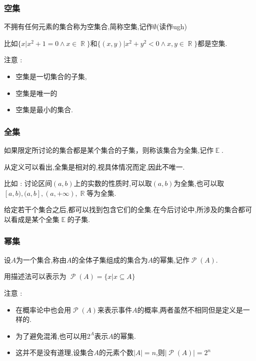 \documentclass[UTF8,12pt]{ctexbook}
\newcommand{\absoluteValue}[1]{\left\lvert #1 \right\vert}
\newcommand{\powerSetOf}[1]{\powerSet (#1)}
\DeclareMathOperator{\mathRealNumberCollection}{\mathbb{R}}
\DeclareMathOperator{\mathEverythingCollection}{\mathbb{E}}
\DeclareMathOperator{\powerSet}{\mathcal{P}}
\begin{document}
{{{{\subsubsection{空集}{
  不拥有任何元素的集合称为空集合,简称空集,记作$\emptyset$(读作ugh)

  比如$\{x | x^2 + 1 = 0 \land x \in \mathRealNumberCollection\}$和$\{(x,y) | x^2+y^2 < 0 \land x,y \in \mathRealNumberCollection\}$都是空集.

  注意 :

  \begin{itemize}
    \item 空集是一切集合的子集,
    \item 空集是唯一的
    \item 空集是最小的集合.
  \end{itemize}
}%

\subsubsection{全集}{
  如果限定所讨论的集合都是某个集合的子集，则称该集合为全集,记作$\mathEverythingCollection$.

  从定义可以看出,全集是相对的,视具体情况而定,因此不唯一.

  比如 : 讨论区间$(a,b)$上的实数的性质时,可以取$(a,b)$为全集,也可以取$[a,b),(a,b],(a , +\infty),\mathRealNumberCollection$等为全集.

  给定若干个集合之后,都可以找到包含它们的全集.在今后讨论中,所涉及的集合都可以看成是某个全集$\mathEverythingCollection$的子集.
}%

\subsubsection{幂集}{
  设$A$为一个集合,称由$A$的全体子集组成的集合为$A$的幂集,记作$\powerSetOf{A}$.

  用描述法可以表示为 $\powerSetOf{A} = \{x | x \subseteq A\}$

  注意 :

  \begin{itemize}
    \item 在概率论中也会用$\powerSetOf{A}$来表示事件$A$的概率,两者虽然不相同但是定义是一样的.
    \item 为了避免混淆,也可以用$2^A$表示$A$的幂集.
    \item 这并不是没有道理,设集合$A$的元素个数$\absoluteValue{A} = n$,则$\absoluteValue{\powerSetOf{A}} = 2^n$
  \end{itemize}
}%

}}}}
\end{document}
